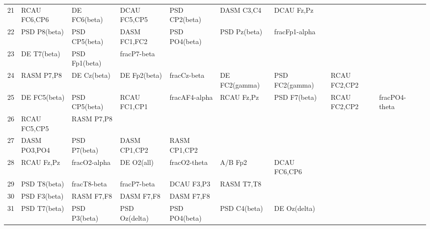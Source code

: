 \begin{landscape}
\begin{table}[]
\begin{tabular}{l|llllllll}
21       & RCAU FC6,CP6   & DE FC6(beta)   & DCAU FC5,CP5   & PSD CP2(beta)  & DASM C3,C4     & DCAU Fz,Pz     &                &                &               &              \\
22       & PSD P8(beta)   & PSD CP5(beta)  & DASM FC1,FC2   & PSD PO4(beta)  & PSD Pz(beta)   & fracFp1-alpha  &                &                &               &              \\
23       & DE T7(beta)    & PSD Fp1(beta)  & fracP7-beta    &                &                &                &                &                &               &              \\
24       & RASM P7,P8     & DE Cz(beta)    & DE Fp2(beta)   & fracCz-beta    & DE FC2(gamma)  & PSD FC2(gamma) & RCAU FC2,CP2   &                &               &              \\
25       & DE FC5(beta)   & PSD CP5(beta)  & RCAU FC1,CP1   & fracAF4-alpha  & RCAU Fz,Pz     & PSD F7(beta)   & RCAU FC2,CP2   & fracPO4-theta  &               &              \\
26       & RCAU FC5,CP5   & RASM P7,P8     &                &                &                &                &                &                &               &              \\
27       & DASM PO3,PO4   & PSD P7(beta)   & DASM CP1,CP2   & RASM CP1,CP2   &                &                &                &                &               &              \\
28       & RCAU Fz,Pz     & fracO2-alpha   & DE O2(all)     & fracO2-theta   & A/B Fp2        & DCAU FC6,CP6   &                &                &               &              \\
29       & PSD T8(beta)   & fracT8-beta    & fracP7-beta    & DCAU F3,P3     & RASM T7,T8     &                &                &                &               &              \\
30       & PSD F3(beta)   & RASM F7,F8     & DASM F7,F8     & DASM F7,F8     &                &                &                &                &               &              \\
31       & PSD T7(beta)   & PSD P3(beta)   & PSD Oz(delta)  & PSD PO4(beta)  & PSD C4(beta)   & DE Oz(delta)   &                &                &               &              \\
\end{tabular}
\end{table}
\end{landscape}